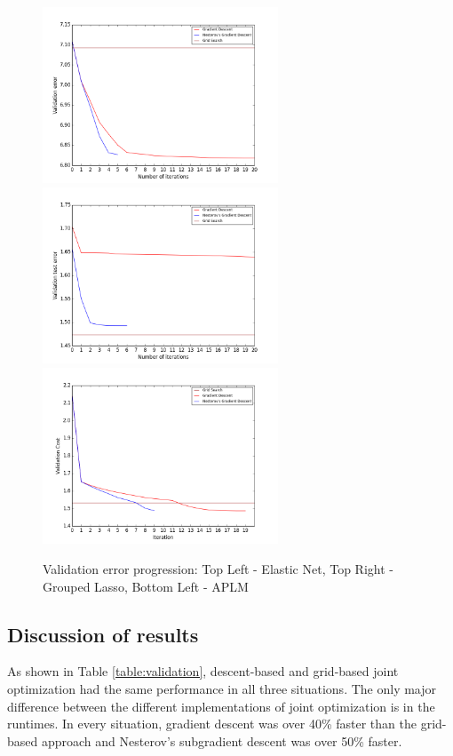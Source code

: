 \documentclass[10pt,letterpaper]{article}
\begin{document}
\begin{figure} 
\includegraphics[width=70mm]{elasticnet_costpath_80_250_15.png}
\includegraphics[width=70mm]{grouped_lasso_60_1500_3_150.png}
\includegraphics[width=70mm]{smooth_linear_simple_cost_path_1_100_20_6.png}
\caption{Validation error progression: Top Left - Elastic Net, Top Right - Grouped Lasso, Bottom Left - APLM}
\label{figure:costpath}
\end{figure}

\subsection{Discussion of results}

As shown in Table \ref{table:validation}, descent-based and grid-based joint optimization had the same performance in all three situations. The only major difference between the different implementations of joint optimization is in the runtimes. In every situation, gradient descent was over 40\% faster than the grid-based approach and Nesterov's subgradient descent was over 50\% faster.
\end{document}
